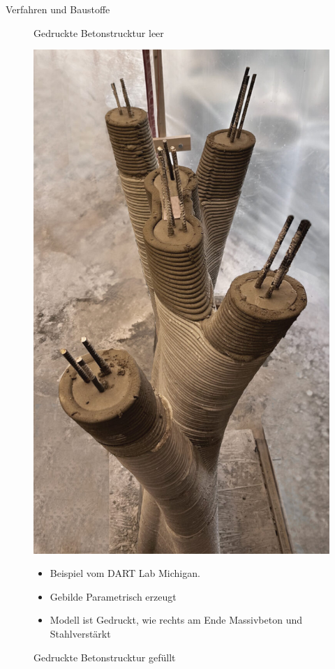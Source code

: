\documentclass{beamer}
\begin{document}
\begin{frame}{Verfahren und Baustoffe}
\begin{figure}[H]
\begin{minipage}{0.3\textwidth}
           \caption{Gedruckte Betonstrucktur leer \parencite{meibodi2023}}
           \label{fig:leer}
        \end{minipage}
        \begin{minipage}{0.3\textwidth}
           \centering
           \includegraphics[width=\linewidth]{figures/beispiele/meibodi-2023-2.jpg}
           \caption{Gedruckte Betonstrucktur gef\"ullt \parencite{meibodi2023}}
           \label{fig:voll}
        \end{minipage}
        \begin{minipage}{0.3\textwidth}
            \begin{itemize}
                \item Beispiel vom DART Lab Michigan. 
                \item Gebilde Parametrisch erzeugt
                \item Modell ist Gedruckt, wie rechts am Ende Massivbeton und Stahlverst\"arkt
            \end{itemize}
        \end{minipage}
    \end{figure}
\end{frame}
\end{document}
